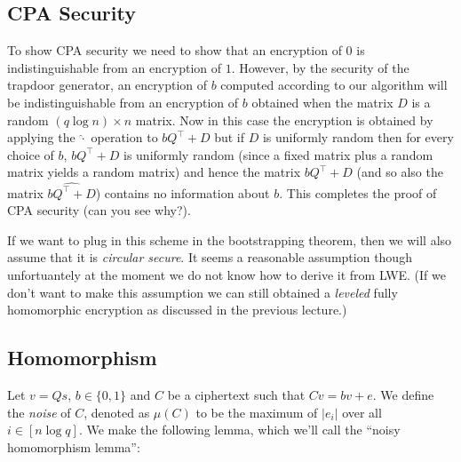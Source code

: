 \subsection{CPA Security}\label{CPA-Security}

To show CPA security we need to show that an encryption of \(0\) is
indistinguishable from an encryption of \(1\). However, by the security
of the trapdoor generator, an encryption of \(b\) computed according to
our algorithm will be indistinguishable from an encryption of \(b\)
obtained when the matrix \(D\) is a random \((q\log n)\times n\) matrix.
Now in this case the encryption is obtained by applying the
\(\hat{\cdot}\) operation to \(bQ^\top +D\) but if \(D\) is uniformly
random then for every choice of \(b\), \(bQ^\top + D\) is uniformly
random (since a fixed matrix plus a random matrix yields a random
matrix) and hence the matrix \(bQ^\top + D\) (and so also the matrix
\(\widehat{bQ^\top+D}\)) contains no information about \(b\). This
completes the proof of CPA security (can you see why?).

If we want to plug in this scheme in the bootstrapping theorem, then we
will also assume that it is \emph{circular secure}. It seems a
reasonable assumption though unfortuantely at the moment we do not know
how to derive it from LWE. (If we don't want to make this assumption we
can still obtained a \emph{leveled} fully homomorphic encryption as
discussed in the previous lecture.)

\subsection{Homomorphism}\label{Homomorphism}

Let \(v=Qs\), \(b\in\{0,1\}\) and \(C\) be a ciphertext such that
\(Cv = bv + e\). We define the \emph{noise} of \(C\), denoted as
\(\mu(C)\) to be the maximum of \(|e_i|\) over all \(i\in[n\log q]\). We
make the following lemma, which we'll call the ``noisy homomorphism
lemma'':

\hypertarget{noisehomolem}{}

